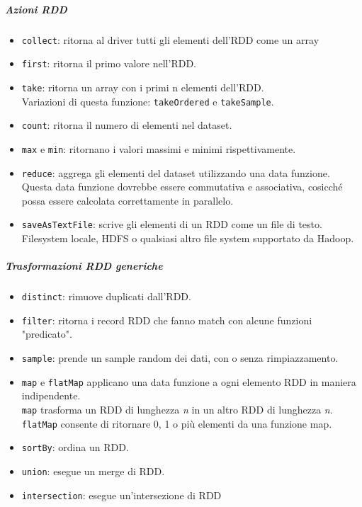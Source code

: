 \documentclass{article}
\begin{document}
\begin{appendices}
\subparagraph{Azioni RDD}
\begin{itemize}
    \item \texttt{collect}: ritorna al driver tutti gli elementi dell'RDD come un array 
    \item \texttt{first}: ritorna il primo valore nell'RDD.
    \item \texttt{take}: ritorna un array con i primi n elementi dell'RDD. \\ Variazioni di questa funzione: \texttt{takeOrdered} e \texttt{takeSample}.
    \item \texttt{count}: ritorna il numero di elementi nel dataset.
    \item \texttt{max} e \texttt{min}: ritornano i valori massimi e minimi rispettivamente.
    \item \texttt{reduce}: aggrega gli elementi del dataset utilizzando una data funzione. Questa data funzione dovrebbe essere commutativa e associativa, cosicché possa essere calcolata correttamente in parallelo.
    \item \texttt{saveAsTextFile}: scrive gli elementi di un RDD come un file di testo. Filesystem locale, HDFS o qualsiasi altro file system supportato da Hadoop.
\end{itemize}

\subparagraph{Trasformazioni RDD generiche}
\begin{itemize}
    \item \texttt{distinct}: rimuove duplicati dall'RDD.
    \item \texttt{filter}: ritorna i record RDD che fanno match con alcune funzioni "predicato".
    \item \texttt{sample}: prende un sample random dei dati, con o senza rimpiazzamento.
    \item \texttt{map} e \texttt{flatMap} applicano una data funzione a ogni elemento RDD in maniera indipendente. \\
    \texttt{map} trasforma un RDD di lunghezza \textit{n} in un altro RDD di lunghezza \textit{n}. \\
    \texttt{flatMap} consente di ritornare 0, 1 o più elementi da una funzione map.
    \item \texttt{sortBy}: ordina un RDD.
    \item \texttt{union}: esegue un merge di RDD.
    \item \texttt{intersection}: esegue un'intersezione di RDD
\end{itemize}


\end{appendices}
\end{document}
